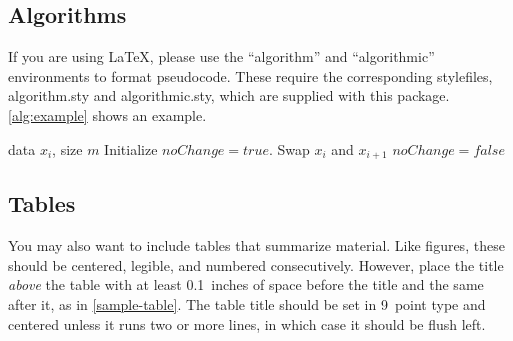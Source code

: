 \documentclass{article}
\theoremstyle{plain}
\theoremstyle{definition}
\theoremstyle{remark}
\begin{document}
\subsection{Algorithms}

If you are using \LaTeX, please use the ``algorithm'' and ``algorithmic''
environments to format pseudocode. These require
the corresponding stylefiles, algorithm.sty and
algorithmic.sty, which are supplied with this package.
\cref{alg:example} shows an example.

\begin{algorithm}[tb]
   \caption{Bubble Sort}
   \label{alg:example}
\begin{algorithmic}
    data $x_i$, size $m$
   \REPEAT
   \STATE Initialize $noChange = true$.
   \STATE Swap $x_i$ and $x_{i+1}$
   \STATE $noChange = false$
   \ENDIF
   \ENDFOR
\end{algorithmic}
\end{algorithm}

\subsection{Tables}

You may also want to include tables that summarize material. Like
figures, these should be centered, legible, and numbered consecutively.
However, place the title \emph{above} the table with at least
0.1~inches of space before the title and the same after it, as in
\cref{sample-table}. The table title should be set in 9~point
type and centered unless it runs two or more lines, in which case it
should be flush left.

\end{document}
